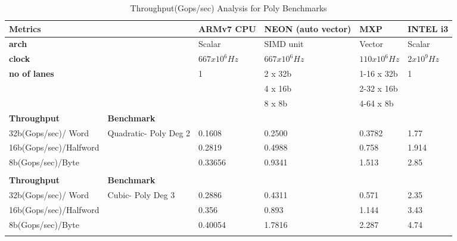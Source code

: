 \begin{table}[htbp]
	\centering
	\begin{adjustbox}{width=1\textwidth}
		\small
		\begin{tabular}{llllll}
			\toprule
			\textbf{Metrics} &   & \textbf{ARMv7 CPU} & \textbf{NEON (auto vector)} & \textbf{MXP} & \textbf{INTEL i3} \\
			\midrule
			\textbf{arch} &   & Scalar & SIMD unit & Vector & Scalar \\
			\textbf{clock} &   & $667 x 10^{6}Hz$ & $667 x 10^{6}Hz$ & $110 x 10^{6}Hz$ & $2 x 10^{9}Hz$ \\
			\textbf{no of lanes} &   & 1 & 2 x 32b & 1-16 x 32b & 1 \\
			&   &   & 4 x 16b & 2-32 x 16b &  \\
			&   &   & 8 x 8b & 4-64 x 8b &  \\
			\midrule
			 \textbf{Throughput} & \textbf{Benchmark} &   &   &   &  \\
			\midrule
			 32b(Gops/sec)/ Word   & Quadratic- Poly Deg 2  & 0.1608  & 0.2500 & 0.3782 & 1.77 \\
			 16b(Gops/sec)/Halfword &   & 0.2819 & 0.4988 & 0.758 & 1.914\\
			 8b(Gops/sec)/Byte &   & 0.33656 & 0.9341 & 1.513 & 2.85 \\
			   &   &   &   &   &  \\
			\midrule
			 \textbf{Throughput} & \textbf{Benchmark} &   &   &   &  \\
			\midrule
			 32b(Gops/sec)/ Word   & Cubic- Poly Deg 3    & 0.2886 & 0.4311 & 0.571 & 2.35 \\
			 16b(Gops/sec)/Halfword &   & 0.356 & 0.893 & 1.144 & 3.43 \\
			 8b(Gops/sec)/Byte &   & 0.40054 & 1.7816 & 2.287 & 4.74 \\
			   &   &   &   &   &  \\
			\bottomrule
		\end{tabular}%
	\end{adjustbox}%
	\caption{Throughput(Gops/sec) Analysis for Poly Benchmarks}
	\label{poly:c}%
\end{table}%
